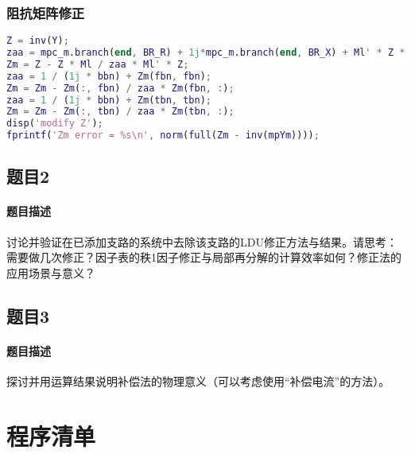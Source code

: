 \documentclass[a4paper,12pt]{article}
\begin{document}
    \subsubsection{阻抗矩阵修正}

    \begin{lstlisting}[language=matlab,label=lst:q2q1p2,caption={阻抗矩阵修正程序}]
%% Modify Z
Z = inv(Y);
zaa = mpc_m.branch(end, BR_R) + 1j*mpc_m.branch(end, BR_X) + Ml' * Z * Ml;
Zm = Z - Z * Ml / zaa * Ml' * Z;
zaa = 1 / (1j * bbn) + Zm(fbn, fbn);
Zm = Zm - Zm(:, fbn) / zaa * Zm(fbn, :);
zaa = 1 / (1j * bbn) + Zm(tbn, tbn);
Zm = Zm - Zm(:, tbn) / zaa * Zm(tbn, :);
disp('modify Z');
fprintf('Zm error = %s\n', norm(full(Zm - inv(mpYm))));
    \end{lstlisting}
    \subsection{题目2}
    \paragraph{题目描述} 讨论并验证在已添加支路的系统中去除该支路的LDU修正方法与结果。请思考：需要做几次修正？因子表的秩1因子修正与局部再分解的计算效率如何？修正法的应用场景与意义？
    \subsection{题目3}
    \paragraph{题目描述} 探讨并用运算结果说明补偿法的物理意义（可以考虑使用“补偿电流”的方法）。

    \newpage
    
    
    \appendix
    \section{程序清单}
      
      
      
      
      
      
      
      
    \label{applastpage}
\iffalse
\begin{itemize}[noitemsep,topsep=0pt]
\end{itemize}
\begin{enumerate}[label=\Roman{*}.,noitemsep,topsep=0pt]
\end{enumerate}
\begin{multicols}{2}
\end{multicols}
\fi
\end{document}

